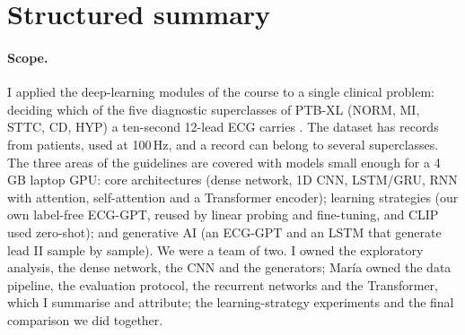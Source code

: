 \section*{Structured summary}

\paragraph{Scope.}
I applied the deep-learning modules of the course to a single clinical problem: deciding which of the
five diagnostic superclasses of PTB-XL (NORM, MI, STTC, CD, HYP) a ten-second 12-lead ECG carries
\cite{wagner2020ptbxl,ptbxl_physionet,pollard2026physionet}. The dataset has \edaNRecordsAll{} records
from \edaNPatientsAll{} patients, used at 100\,Hz, and a record can belong to several superclasses. The
three areas of the guidelines \cite{course_message_2011} are covered with models small enough for a
4\,GB laptop GPU: core architectures (dense network, 1D CNN, LSTM/GRU, RNN with attention,
self-attention and a Transformer encoder); learning strategies (our own label-free ECG-GPT, reused by
linear probing and fine-tuning, and CLIP used zero-shot); and generative AI (an ECG-GPT and an LSTM
that generate lead II sample by sample). We were a team of two. I owned the exploratory analysis, the
dense network, the CNN and the generators; Mar\'ia owned the data pipeline, the evaluation protocol,
the recurrent networks and the Transformer, which I summarise and attribute; the learning-strategy
experiments and the final comparison we did together.

